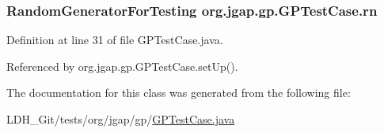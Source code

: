 \hypertarget{classorg_1_1jgap_1_1gp_1_1_g_p_test_case_ab0dd5945056461ec655ebda0f7bc19ea}{
\subsubsection[{rn}]{\setlength{\rightskip}{0pt plus 5cm}Random\-Generator\-For\-Testing org.\-jgap.\-gp.\-G\-P\-Test\-Case.\-rn\hspace{0.3cm}{\ttfamily [protected]}}}\label{classorg_1_1jgap_1_1gp_1_1_g_p_test_case_ab0dd5945056461ec655ebda0f7bc19ea}


Definition at line 31 of file G\-P\-Test\-Case.\-java.



Referenced by org.\-jgap.\-gp.\-G\-P\-Test\-Case.\-set\-Up().



The documentation for this class was generated from the following file\-:\begin{DoxyCompactItemize}
\item 
L\-D\-H\-\_\-\-Git/tests/org/jgap/gp/\hyperlink{_g_p_test_case_8java}{G\-P\-Test\-Case.\-java}\end{DoxyCompactItemize}
